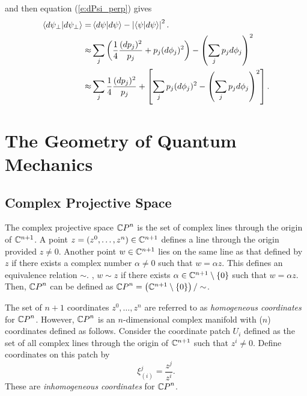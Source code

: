 and then equation (\ref{e:dPsi_perp}) gives
\begin{equation}
\begin{split}
    {\langle{d\psi_\perp}|{d\psi_\perp}\rangle} 
        =&\, {\langle{d\psi}|{d\psi}\rangle} - \left| {\langle{\psi}|{d\psi}\rangle} \right|^2.\\
        \approx& \sum_j 
                    \left( 
                           \frac{1}{4}\frac{(dp_j)^2}{p_j}
                           +p_j(d\phi_j)^2
                    \right)
            - \left( \sum_jp_jd\phi_j \right)^2\\
        \approx& \sum_j \frac{1}{4}\frac{(dp_j)^2}{p_j}
                  + \left[ 
                           \sum_j p_j(d\phi_j)^2
                           - \left( \sum_jp_jd\phi_j \right)^2
                    \right].
\end{split}
\end{equation}


\section{The Geometry of Quantum Mechanics}
\label{sec:geometryQM}

\subsection{Complex Projective Space}

The complex projective space ${\mathbb{C} P}^n$ is the set of complex lines
through the origin of ${\mathbb{C}}^{n+1}$.
A point $z=(z^0,\ldots,z^n)\in{\mathbb{C}}^{n+1}$ defines a line through
the origin provided $z\ne 0$.
Another point $w\in{\mathbb{C}}^{n+1}$ lies on the same line as that
defined by $z$ if there exists a complex number $\alpha\ne 0$
such that $w=\alpha z$.  This defines an equivalence relation $\sim$.
\ie, $w\sim z$ if there exists $\alpha\in{\mathbb{C}}^{n+1}\setminus\lbrace 0\rbrace$
such that $w=\alpha z$.  Then, ${\mathbb{C} P}^n$ can be defined as 
${\mathbb{C} P}^n=\left( {\mathbb{C}}^{n+1}\setminus\lbrace 0\rbrace\right)/\sim$.

The set of $n+1$ coordinates $z^0,\ldots,z^n$ are referred to as
\emph{homogeneous coordinates}
for ${\mathbb{C} P}^n$.  However, ${\mathbb{C} P}^n$ is an $n$-dimensional complex
manifold with ($n$) coordinates defined as follows.
Consider the coordinate patch $U_i$ defined as the set of all
complex lines through the origin of ${\mathbb{C}}^{n+1}$ such that $z^i\ne 0$.
Define coordinates on this patch by
\begin{equation}
\xi^j_{(i)} = \frac{z^j}{z^i}.
\end{equation}
These are \emph{inhomogeneous coordinates} for ${\mathbb{C} P}^n$.

